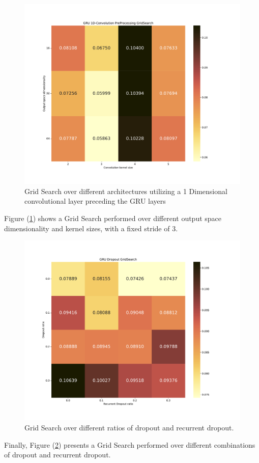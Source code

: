 \documentclass
[twocolumn,
secnumarabic,
nobibnotes,
aps,
prl,
reprint,
groupedaddress,
amsmath,
amssymb,
]{revtex4-2}
\begin{document}
\begin{figure}
  \includegraphics[width=.725\textwidth]{figures/Large_forecast_conv_gridsearch_gru.pdf}
  \caption{\label{fig_gsconv}Grid Search over different architectures utilizing a 1 Dimensional convolutional layer preceding the GRU layers}
\end{figure}

Figure (\ref{fig_gsconv}) shows a Grid Search performed over different output space dimensionality and kernel sizes, with a fixed stride of 3.

\begin{figure}
  \includegraphics[width=.725\textwidth]{figures/Large_forecast_dropout_gridsearch_gru.pdf}
  \caption{\label{fig_gsdrop}Grid Search over different ratios of dropout and recurrent dropout.}
\end{figure}

Finally, Figure (\ref{fig_gsdrop}) presents a Grid Search performed over different combinations of dropout and recurrent dropout. 
\end{document}
